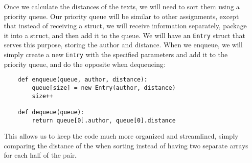 \documentclass[12pt]{article}
\begin{document}
Once we calculate the distances of the texts, we will need to sort them using a priority queue. Our priority queue will be similar to other assignments, except that instead of receiving a struct, we will receive information separately, package it into a struct, and then add it to the queue. We will have an \verb|Entry| struct that serves this purpose, storing the author and distance. When we enqueue, we will simply create a new \verb|Entry| with the specified parameters and add it to the priority queue, and do the opposite when dequeueing:
\begin{verbatim}
    def enqueue(queue, author, distance):
        queue[size] = new Entry(author, distance)
        size++

    def dequeue(queue):
        return queue[0].author, queue[0].distance
\end{verbatim}
This allows us to keep the code much more organized and streamlined, simply comparing the distance of the when sorting instead of having two separate arrays for each half of the pair.
\end{document}
